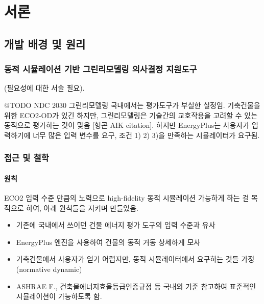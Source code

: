 \part{서론}
\label{part:introduction}


\chapter{개발 배경 및 원리}

\section{동적 시뮬레이션 기반 그린리모델링 의사결정 지원도구}
(필요성에 대한 서술 필요)\cite{van2018epb}.

@TODO
NDC 2030 그린리모델링 국내에서는 평가도구가 부실한 실정임. 기축건물을 위한 ECO2-OD가 있긴 하지만, 그린리모델링은 기술간의 교호작용을 고려할 수 있는 동적으로 평가하는 것이 맞음 [형곤 AIK citation]. 하지만 EnergyPlus는 사용자가 입력하기에 너무 많은 입력 변수를 요구, 조건 1) 2) 3)을 만족하는 시뮬레이터가 요구됨.


\section{ 접근 및 철학}

\subsection{원칙}
ECO2 입력 수준 만큼의 노력으로 high-fidelity 동적 시뮬레이션 가능하게 하는 걸 목적으로 하여, 아래 원칙들을 지키며 만들었음.

\begin{itemize}
  \item 기존에 국내에서 쓰이던 건물 에너지 평가 도구의 입력 수준과 유사
  \item EnergyPlus 엔진을 사용하여 건물의 동적 거동 상세하게 모사
  \item 기축건물에서 사용자가 얻기 어렵지만, 동적 시뮬레이터에서 요구하는 것들 가정 (normative dynamic)
  \item ASHRAE F., 건축물에너지효율등급인증규정 등 국내외 기준 참고하여 표준적인 시뮬레이션이 가능하도록 함.
\end{itemize}

